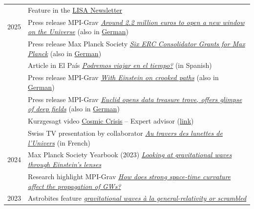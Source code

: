 \documentclass[11pt,a4paper]{article}
\begin{document}
\begin{longtable}{c p{15cm}}
& Feature in the \href{https://www.lisamission.org/?na=v&nk=882-dcfc753f05&id=31}{LISA Newsletter} \\[2pt]
2025  & Press release MPI-Grav 
\href{https://www.aei.mpg.de/1359867/erc-consolidator-grant-for-miguel-zumalac-rregui}{\it Around 2.2 million euros to open a new window on the Universe} (also in \href{https://www.aei.mpg.de/1363635/erc-consolidator-grant-for-miguel-zumalac-rregui}{German})
\\[2pt]
& Press release Max Planck Society
\href{https://www.mpg.de/25845263/erc-consolidator-grants-2025}{\it Six ERC Consolidator Grants for Max Planck} (also in \href{https://www.mpg.de/25844813/sechs-erc-consolidator-grants-fur-max-planck}{German})
\\[2pt]
 & Article in El Pa\'is \href{https://elpais.com/ideas/2025-08-02/velocidades-improbables-y-agujeros-de-gusano-podremos-viajar-en-el-tiempo.html}{\it Podremos viajar en el tiempo?} (in Spanish)
\\[2pt]
& Press release MPI-Grav \href{https://www.aei.mpg.de/1227766/with-einstein-on-crooked-paths}{\it With Einstein on crooked paths} (also in \href{https://www.aei.mpg.de/1227958/with-einstein-on-crooked-paths}{German})\\[2pt]
& Press release MPI-Grav \href{https://www.aei.mpg.de/1240576/euclid-opens-data-treasure-trove-offers-glimpse-of-deep-fields}{\it Euclid opens data treasure trove, offers glimpse of deep fields} (also in \href{https://www.aei.mpg.de/1240587/euclid-opens-data-treasure-trove-offers-glimpse-of-deep-fields}{German})\\[2pt]
& Kurzgesagt video \href{https://www.youtube.com/watch?v=zozEm4f_dlw}{Cosmic Crisis} -- Expert advisor (\href{https://sites.google.com/view/sources-cosmic-crisis/}{link}) \\[2pt]
& Swiss TV presentation by collaborator  \href{https://www.unige.ch/cite/evenements/ma-these-en-180-secondes/mt180-2025/les-finalistes/martin-pijnenburg}{\it Au travers des lunettes de l'Univers} (in French) \\[2pt]
2024 & Max Planck Society Yearbook (2023) \href{https://www.mpg.de/21438017/aei_jb_2023}{\textit{Looking at gravitational waves through Einstein's lenses}} \\[2pt]
& Research highlight MPI-Grav \href{https://www.aei.mpg.de/1183585/strong-space-time-curvature}{\textit{How does strong space-time curvature affect the propagation of GWs?}} \\[3pt]
2023 & {Astrobites feature} \href{https://astrobites.org/2023/04/11/gravitational-waves-a-la-general-relativity-or-scrambled/}{\textit{gravitational waves \`{a} la general-relativity or scrambled}} \\[2pt]

\end{longtable}
\end{document}
